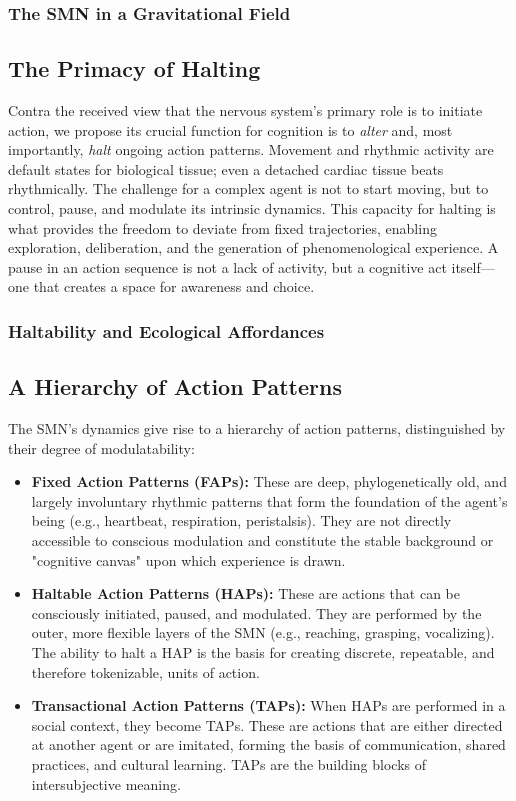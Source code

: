 \documentclass[10pt,letterpaper]{article}
\begin{document}
\subsubsection*{The SMN in a Gravitational Field}

\subsection*{The Primacy of Halting}
Contra the received view that the nervous system's primary role is to initiate action, we propose its crucial function for cognition is to \textit{alter} and, most importantly, \textit{halt} ongoing action patterns. Movement and rhythmic activity are default states for biological tissue; even a detached cardiac tissue beats rhythmically. The challenge for a complex agent is not to start moving, but to control, pause, and modulate its intrinsic dynamics. This capacity for halting is what provides the freedom to deviate from fixed trajectories, enabling exploration, deliberation, and the generation of phenomenological experience. A pause in an action sequence is not a lack of activity, but a cognitive act itself—one that creates a space for awareness and choice.

\subsubsection*{Haltability and Ecological Affordances}

\subsection*{A Hierarchy of Action Patterns}
The SMN's dynamics give rise to a hierarchy of action patterns, distinguished by their degree of modulatability:
\begin{itemize}
    \item \textbf{Fixed Action Patterns (FAPs):} These are deep, phylogenetically old, and largely involuntary rhythmic patterns that form the foundation of the agent's being (e.g., heartbeat, respiration, peristalsis). They are not directly accessible to conscious modulation and constitute the stable background or "cognitive canvas" upon which experience is drawn.
    \item \textbf{Haltable Action Patterns (HAPs):} These are actions that can be consciously initiated, paused, and modulated. They are performed by the outer, more flexible layers of the SMN (e.g., reaching, grasping, vocalizing). The ability to halt a HAP is the basis for creating discrete, repeatable, and therefore tokenizable, units of action.
    \item \textbf{Transactional Action Patterns (TAPs):} When HAPs are performed in a social context, they become TAPs. These are actions that are either directed at another agent or are imitated, forming the basis of communication, shared practices, and cultural learning. TAPs are the building blocks of intersubjective meaning.
\end{itemize}
\end{document}
